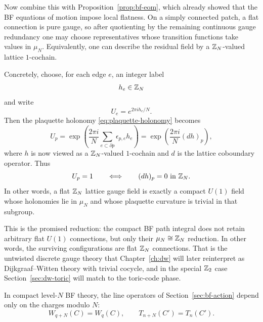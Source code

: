 Now combine this with Proposition~\ref{prop:bf-eom}, which already showed that the BF equations of motion impose local flatness. On a simply connected patch, a flat connection is pure gauge, so after quotienting by the remaining continuous gauge redundancy one may choose representatives whose transition functions take values in $\mu_N$. Equivalently, one can describe the residual field by a $\mathbb{Z}_N$-valued lattice $1$-cochain.

\medskip

\noindent Concretely, choose, for each edge $e$, an integer label
\begin{equation*}
h_e \in \mathbb{Z}_N
\end{equation*}
and write
\begin{equation}\label{eq:U-from-h}
U_e = e^{2\pi i h_e/N}.
\end{equation}
Then the plaquette holonomy \eqref{eq:plaquette-holonomy} becomes
\begin{equation}\label{eq:Up-from-h}
U_p
=
\exp\!\left(\frac{2\pi i}{N}\sum_{e\subset \partial p}\epsilon_{p,e}h_e\right)
=
\exp\!\left(\frac{2\pi i}{N}(dh)_p\right),
\end{equation}
where $h$ is now viewed as a $\mathbb{Z}_N$-valued $1$-cochain and $d$ is the lattice coboundary operator. Thus
\begin{equation}\label{eq:flatness-mod-N}
U_p = 1
\qquad\Longleftrightarrow\qquad
(dh)_p=0 \ \text{in }\mathbb{Z}_N.
\end{equation}
In other words, a flat $\mathbb{Z}_N$ lattice gauge field is exactly a compact $U(1)$ field whose holonomies lie in $\mu_N$ and whose plaquette curvature is trivial in that subgroup.

\medskip

\noindent This is the promised reduction: the compact BF path integral does not retain arbitrary flat $U(1)$ connections, but only their $\mu_N\cong \mathbb{Z}_N$ reduction. In other words, the surviving configurations are flat $\mathbb{Z}_N$ connections. That is the untwisted discrete gauge theory that Chapter~\ref{ch:dw} will later reinterpret as Dijkgraaf--Witten theory with trivial cocycle, and in the special $\mathbb{Z}_2$ case Section~\ref{sec:dw-toric} will match to the toric-code phase.

\begin{corollary}\label{cor:charges-mod-N}
In compact level-$N$ BF theory, the line operators of Section~\ref{sec:bf-action} depend only on the charges modulo $N$:
\begin{equation}\label{eq:charges-mod-N}
W_{q+N}(C)=W_q(C),
\qquad
T_{n+N}(C')=T_n(C').
\end{equation}
\end{corollary}

